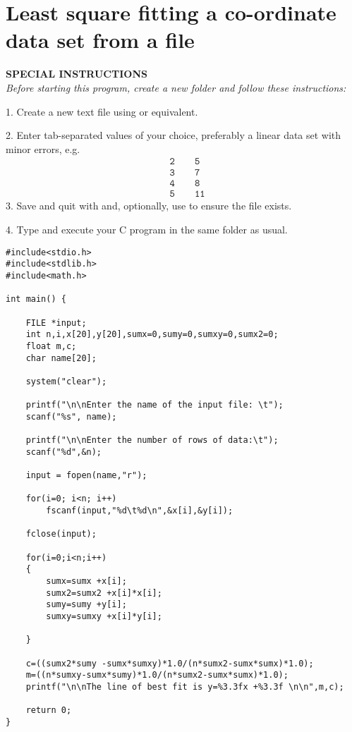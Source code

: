 \documentclass[11pt,oneside]{article}
\newcommand{\info}[1]{\textbf{\scriptsize{\sffamily\addfontfeatures{LetterSpace=7} #1\\[.35em]}}}
\begin{document}
\section{Least square fitting a co-ordinate data set from a file}
\begin{infobox}
\info{\MakeUppercase{Special instructions}}
\textit{Before starting this program, create a new folder and follow these instructions:}

1. Create a new text file using  or equivalent.

2. Enter tab-separated values of your choice, preferably a linear data set with minor errors, e.g.
\begin{align*}
	&\texttt{2} \qquad \texttt{5} \\
	&\texttt{3} \qquad \texttt{7} \\
	&\texttt{4} \qquad \texttt{8} \\
	&\texttt{5} \qquad \texttt{11}
\end{align*}%
3. Save and quit with  and, optionally, use  to ensure the file exists.

4. Type and execute your C program in the same folder as usual.
\end{infobox}
\begin{lstlisting}
#include<stdio.h>
#include<stdlib.h>
#include<math.h>

int main() {

    FILE *input;
    int n,i,x[20],y[20],sumx=0,sumy=0,sumxy=0,sumx2=0;
    float m,c;
    char name[20];
    
    system("clear");
    
    printf("\n\nEnter the name of the input file: \t");
    scanf("%s", name);
    
    printf("\n\nEnter the number of rows of data:\t");
    scanf("%d",&n);
    
    input = fopen(name,"r");
    
    for(i=0; i<n; i++)
        fscanf(input,"%d\t%d\n",&x[i],&y[i]);
    
    fclose(input);
    
    for(i=0;i<n;i++)
    {
        sumx=sumx +x[i];
        sumx2=sumx2 +x[i]*x[i];
        sumy=sumy +y[i];
        sumxy=sumxy +x[i]*y[i];
        
    }
    
    c=((sumx2*sumy -sumx*sumxy)*1.0/(n*sumx2-sumx*sumx)*1.0);
    m=((n*sumxy-sumx*sumy)*1.0/(n*sumx2-sumx*sumx)*1.0);
    printf("\n\nThe line of best fit is y=%3.3fx +%3.3f \n\n",m,c);
    
    return 0;
}
\end{lstlisting}
\pagebreak
%
%
\end{document}
